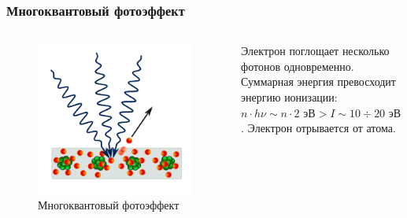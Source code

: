 \documentclass{beamer}
\begin{document}
	\begin{frame}
		\frametitle{Многоквантовый фотоэффект}
		
		\begin{columns}
			\begin{figure}
				\centering
				\includegraphics[width=0.8\linewidth]{res/multiphoton.png}
				\caption*{Многоквантовый фотоэффект}
			\end{figure}
		
			Электрон поглощает несколько фотонов одновременно. Суммарная энергия превосходит энергию ионизации: $n \cdot h\nu \sim n \cdot 2 \text{ эВ} > I \sim 10 \div 20 \text{ эВ}$. Электрон отрывается от атома.
		\end{columns}
	\end{frame}
	
\end{document}
